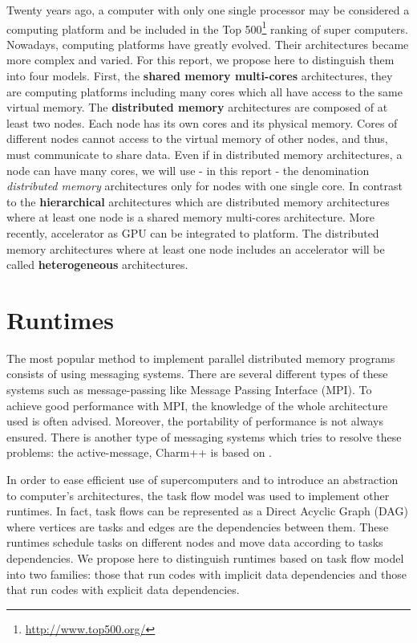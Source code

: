 Twenty years ago, a computer with only one single processor may be considered a computing platform and be included in the Top 500\footnote{\url{http://www.top500.org/}}  ranking of super computers. Nowadays, computing platforms have greatly evolved. Their architectures became more complex and varied. For this report, we propose here to distinguish them into four models. First, the \textbf{shared memory multi-cores} architectures, they are computing platforms including many cores which all have access to the same virtual memory. The \textbf{distributed memory} architectures are composed of at least two nodes. Each node has its own cores and its physical memory. Cores of different nodes cannot access to the virtual memory of other nodes, and thus, must communicate to share data. Even if in distributed memory architectures, a node can have many cores,  we will use - in this report - the denomination \textit{distributed memory} architectures only for nodes with one single core. In contrast to the \textbf{hierarchical} architectures which are distributed memory architectures where at least one node is a shared memory multi-cores architecture. More recently, accelerator as GPU can be integrated to platform. The distributed memory architectures where at least one node includes an accelerator will be called \textbf{heterogeneous} architectures.

\section{Runtimes}
The most popular method to implement parallel distributed memory programs consists of using messaging systems. There are several different types of these systems such as message-passing like Message Passing Interface (MPI)\cite{Message94}. To achieve good performance with MPI, the knowledge of the whole architecture used is often advised. Moreover, the portability of performance is not always ensured. There is another type of messaging systems which tries to resolve these problems: the active-message, Charm++ is based on \cite{KaleLVandK1993b}.

In order to ease efficient use of supercomputers and to introduce an abstraction to computer's architectures, the task flow model was used to implement other runtimes. In fact, task flows can be represented as a Direct Acyclic Graph (DAG) where vertices are tasks and edges are the dependencies between them. These runtimes schedule tasks on different nodes and move data according to tasks dependencies.
We propose here to distinguish runtimes based on task flow model into two families: those that run codes with implicit data dependencies and those that run codes with explicit data dependencies.

